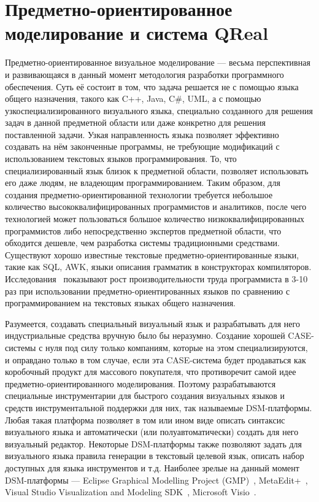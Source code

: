 \documentclass[a4paper]{article}
\begin{document}
\section{Предметно-ориентированное моделирование и система QReal}
Предметно-ориентированное визуальное моделирование --- весьма перспективная и развивающаяся в данный момент методология разработки программного обеспечения. Суть её состоит в том, что задача решается не с помощью языка общего назначения, такого как C++, Java, C\#, UML, а с помощью узкоспециализированного визуального языка, специально созданного для решения задач в данной предметной области или даже конкретно для решения поставленной задачи. Узкая направленность языка позволяет эффективно создавать на нём законченные программы, не требующие модификаций с использованием текстовых языков программирования. То, что специализированный язык близок к предметной области, позволяет использовать его даже людям, не владеющим программированием. Таким образом, для создания предметно-ориентированной технологии требуется небольшое количество высококвалифицированных программистов и аналитиков, после чего технологией может пользоваться большое количество низкоквалифицированных программистов либо непосредственно экспертов предметной области, что обходится дешевле, чем разработка системы традиционными средствами. Существуют хорошо известные текстовые предметно-ориентированные языки, такие как SQL, AWK, языки описания грамматик в конструкторах компиляторов. Исследования~\cite{kelly, kieburtz, weiss} показывают рост производительности труда программиста в 3-10 раз при использовании предметно-ориентированных языков по сравнению с программированием на текстовых языках общего назначения.

Разумеется, создавать специальный визуальный язык и разрабатывать для него индустриальные средства вручную было бы неразумно. Создание хорошей CASE-системы с нуля под силу только компаниям, которые на этом специализируются, и оправдано только в том случае, если эта CASE-система будет продаваться как коробочный продукт для массового покупателя, что противоречит самой идее предметно-ориентированного моделирования. Поэтому разрабатываются специальные инструментарии для быстрого создания визуальных языков и средств инструментальной поддержки для них, так называемые DSM-платформы. Любая такая платформа позволяет в том или ином виде описать синтаксис визуального языка и автоматически (или полуавтоматически) создать для него визуальный редактор. Некоторые DSM-платформы также позволяют задать для визуального языка правила генерации в текстовый целевой язык, описать набор доступных для языка инструментов и т.д. Наиболее зрелые на данный момент DSM-платформы --- Eclipse Graphical Modelling Project (GMP)~\cite{gmp}, MetaEdit+~\cite{metaEditPlus}, Visual Studio Visualization and Modeling SDK~\cite{vsvmsdk}, Microsoft Visio~\cite{visio}. 
\end{document}
